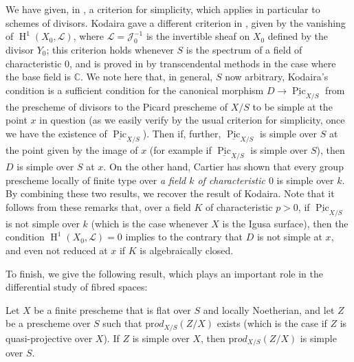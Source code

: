 \begin{remark}\label{fga3.iv-5-remark-5.6}
  We have given, in , a criterion for simplicity, which applies in particular to schemes of divisors.
  Kodaira gave a different criterion in \cite{Kod1956}, given by the vanishing of $\operatorname{H}^1(X_0,\mathcal{L})$, where $\mathcal{L}=\mathcal{J}_0^{-1}$ is the invertible sheaf on $X_0$ defined by the divisor $Y_0$;
  this criterion holds whenever $S$ is the spectrum of a field of characteristic $0$, and is proved in \cite{Kod1956} by transcendental methods in the case where the base field is $\mathbb{C}$.
  We note here that, in general, $S$ now arbitrary, Kodaira's condition is a sufficient condition for the canonical morphism $D\to\underline{\operatorname{Pic}}_{X/S}$ from the prescheme of divisors to the Picard prescheme of $X/S$ to be simple at the point $x$ in question (as we easily verify by the usual criterion for simplicity, once we have the existence of $\underline{\operatorname{Pic}}_{X/S}$).
  Then if, further, $\underline{\operatorname{Pic}}_{X/S}$ is simple over $S$ at the point given by the image of $x$ (for example if $\underline{\operatorname{Pic}}_{X/S}$ is simple over $S$), then $D$ is simple over $S$ at $x$.
  On the other hand, Cartier has shown that every group prescheme locally of finite type over \emph{a field $k$ of characteristic $0$} is simple over $k$.
  By combining these two results, we recover the result of Kodaira.
  Note that it follows from these remarks that, over a field $K$ of characteristic $p>0$, if $\underline{\operatorname{Pic}}_{X/S}$ is not simple over $k$ (which is the case whenever $X$ is the Igusa surface), then the condition $\operatorname{H}^1(X_0,\mathcal{L})=0$ implies to the contrary that $D$ is not simple at $x$, and even not reduced at $x$ if $K$ is algebraically closed.
\end{remark}


To finish, we give the following result, which plays an important role in the differential study of fibred spaces:


\begin{proposition}\label{fga3.iv-5-proposition-5.7}
  Let $X$ be a finite prescheme that is flat over $S$ and locally Noetherian, and let $Z$ be a prescheme over $S$ such that $\mathrm{pr}od_{X/S}(Z/X)$ exists (which is the case if $Z$ is quasi-projective over $X$).
  If $Z$ is simple over $X$, then $\mathrm{pr}od_{X/S}(Z/X)$ is simple over $S$.
\end{proposition}

